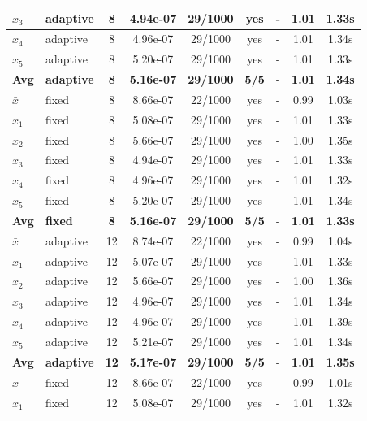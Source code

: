 \begin{longtable}{|l|l|c|c|c|c|c|c|c|}
\hline
$x_3$ & adaptive & 8 & 4.94e-07 & 29/1000 & yes & - & 1.01 & 1.33s \\
\hline
$x_4$ & adaptive & 8 & 4.96e-07 & 29/1000 & yes & - & 1.01 & 1.34s \\
\hline
$x_5$ & adaptive & 8 & 5.20e-07 & 29/1000 & yes & - & 1.01 & 1.33s \\
\hline
\hline\hline
\textbf{Avg} & \textbf{adaptive} & \textbf{8} & \textbf{5.16e-07} & \textbf{29/1000} & \textbf{5/5} & - & \textbf{1.01} & \textbf{1.34s} \\
\hline\hline
\hline
$\bar{x}$ & fixed & 8 & 8.66e-07 & 22/1000 & yes & - & 0.99 & 1.03s \\
\hline
$x_1$ & fixed & 8 & 5.08e-07 & 29/1000 & yes & - & 1.01 & 1.33s \\
\hline
$x_2$ & fixed & 8 & 5.66e-07 & 29/1000 & yes & - & 1.00 & 1.35s \\
\hline
$x_3$ & fixed & 8 & 4.94e-07 & 29/1000 & yes & - & 1.01 & 1.33s \\
\hline
$x_4$ & fixed & 8 & 4.96e-07 & 29/1000 & yes & - & 1.01 & 1.32s \\
\hline
$x_5$ & fixed & 8 & 5.20e-07 & 29/1000 & yes & - & 1.01 & 1.34s \\
\hline
\hline\hline
\textbf{Avg} & \textbf{fixed} & \textbf{8} & \textbf{5.16e-07} & \textbf{29/1000} & \textbf{5/5} & - & \textbf{1.01} & \textbf{1.33s} \\
\hline\hline
$\bar{x}$ & adaptive & 12 & 8.74e-07 & 22/1000 & yes & - & 0.99 & 1.04s \\
\hline
$x_1$ & adaptive & 12 & 5.07e-07 & 29/1000 & yes & - & 1.01 & 1.33s \\
\hline
$x_2$ & adaptive & 12 & 5.66e-07 & 29/1000 & yes & - & 1.00 & 1.36s \\
\hline
$x_3$ & adaptive & 12 & 4.96e-07 & 29/1000 & yes & - & 1.01 & 1.34s \\
\hline
$x_4$ & adaptive & 12 & 4.96e-07 & 29/1000 & yes & - & 1.01 & 1.39s \\
\hline
$x_5$ & adaptive & 12 & 5.21e-07 & 29/1000 & yes & - & 1.01 & 1.34s \\
\hline
\hline\hline
\textbf{Avg} & \textbf{adaptive} & \textbf{12} & \textbf{5.17e-07} & \textbf{29/1000} & \textbf{5/5} & - & \textbf{1.01} & \textbf{1.35s} \\
\hline\hline
\hline
$\bar{x}$ & fixed & 12 & 8.66e-07 & 22/1000 & yes & - & 0.99 & 1.01s \\
\hline
$x_1$ & fixed & 12 & 5.08e-07 & 29/1000 & yes & - & 1.01 & 1.32s \\

\end{longtable}
